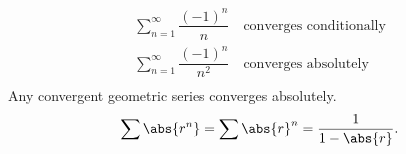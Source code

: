 \begin{example}
    \begin{gather*}
        \sum_{n=1}^\infty \dfrac{(-1)^n}{n} \quad\text{converges conditionally}\\
        \sum_{n=1}^\infty \dfrac{(-1)^n}{n^2}\quad\text{converges absolutely}\\
    \end{gather*}
    Any convergent geometric series converges absolutely.
    \[
        \sum \abs{r^n} = \sum \abs{r}^n = \dfrac{1}{1 - \abs{r}}.
    \]
\end{example}
